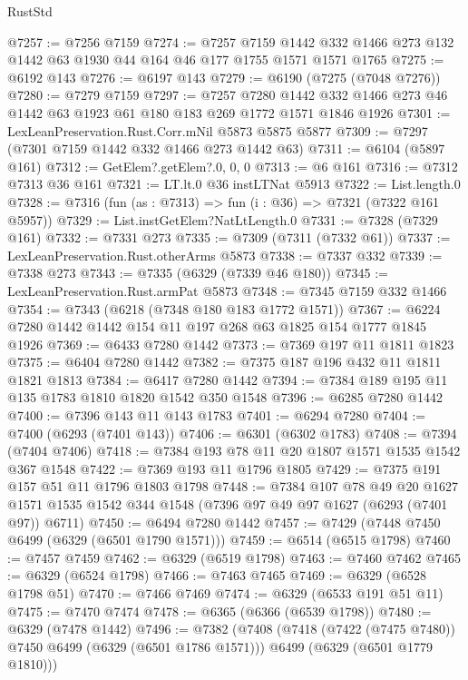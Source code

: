 \begin{lexlean}{RustStd}
\begin{coremodule}
{\begin{coremodule}
{{{{{{{{{{{{{{{{{{{{{{{{{{{{{{{{{{{@7257 := @7256 @7159
@7274 := @7257
    @7159
    @1442
    @332
    @1466
    @273
    @132
    @1442
    @63
    @1930
    @44
    @164
    @46
    @177
    @1755
    @1571
    @1571
    @1765
@7275 := @6192 @143
@7276 := @6197 @143
@7279 := @6190 (@7275 (@7048 @7276))
@7280 := @7279 @7159
@7297 := @7257
    @7280
    @1442
    @332
    @1466
    @273
    @46
    @1442
    @63
    @1923
    @61
    @180
    @183
    @269
    @1772
    @1571
    @1846
    @1926
@7301 := LexLeanPreservation.Rust.Corr.mNil @5873 @5875 @5877
@7309 := @7297 (@7301 @7159 @1442 @332 @1466 @273 @1442 @63)
@7311 := @6104 (@5897 @161)
@7312 := GetElem?.getElem?.{0, 0, 0}
@7313 := @6 @161
@7316 := @7312 @7313 @36 @161
@7321 := LT.lt.{0} @36 instLTNat @5913
@7322 := List.length.{0}
@7328 := @7316 (fun (as : @7313) => fun (i : @36) => @7321 (@7322 @161 @5957))
@7329 := List.instGetElem?NatLtLength.{0}
@7331 := @7328 (@7329 @161)
@7332 := @7331 @273
@7335 := @7309 (@7311 (@7332 @61))
@7337 := LexLeanPreservation.Rust.otherArms @5873
@7338 := @7337 @332
@7339 := @7338 @273
@7343 := @7335 (@6329 (@7339 @46 @180))
@7345 := LexLeanPreservation.Rust.armPat @5873
@7348 := @7345 @7159 @332 @1466
@7354 := @7343 (@6218 (@7348 @180 @183 @1772 @1571))
@7367 := @6224 @7280 @1442 @1442 @154 @11 @197 @268 @63 @1825 @154 @1777 @1845 @1926
@7369 := @6433 @7280 @1442
@7373 := @7369 @197 @11 @1811 @1823
@7375 := @6404 @7280 @1442
@7382 := @7375 @187 @196 @432 @11 @1811 @1821 @1813
@7384 := @6417 @7280 @1442
@7394 := @7384 @189 @195 @11 @135 @1783 @1810 @1820 @1542 @350 @1548
@7396 := @6285 @7280 @1442
@7400 := @7396 @143 @11 @143 @1783
@7401 := @6294 @7280
@7404 := @7400 (@6293 (@7401 @143))
@7406 := @6301 (@6302 @1783)
@7408 := @7394 (@7404 @7406)
@7418 := @7384 @193 @78 @11 @20 @1807 @1571 @1535 @1542 @367 @1548
@7422 := @7369 @193 @11 @1796 @1805
@7429 := @7375 @191 @157 @51 @11 @1796 @1803 @1798
@7448 := @7384
    @107
    @78
    @49
    @20
    @1627
    @1571
    @1535
    @1542
    @344
    @1548
    (@7396 @97 @49 @97 @1627 (@6293 (@7401 @97)) @6711)
@7450 := @6494 @7280 @1442
@7457 := @7429 (@7448 @7450 @6499 (@6329 (@6501 @1790 @1571)))
@7459 := @6514 (@6515 @1798)
@7460 := @7457 @7459
@7462 := @6329 (@6519 @1798)
@7463 := @7460 @7462
@7465 := @6329 (@6524 @1798)
@7466 := @7463 @7465
@7469 := @6329 (@6528 @1798 @51)
@7470 := @7466 @7469
@7474 := @6329 (@6533 @191 @51 @11)
@7475 := @7470 @7474
@7478 := @6365 (@6366 (@6539 @1798))
@7480 := @6329 (@7478 @1442)
@7496 := @7382
    (@7408
      (@7418 (@7422 (@7475 @7480)) @7450 @6499 (@6329 (@6501 @1786 @1571)))
      @6499
      (@6329 (@6501 @1779 @1810)))
}}}}}}}}}}}}}}}}}}}}}}}}}}}}}}}}}}}
\end{coremodule}}
\end{coremodule}
\end{lexlean}
